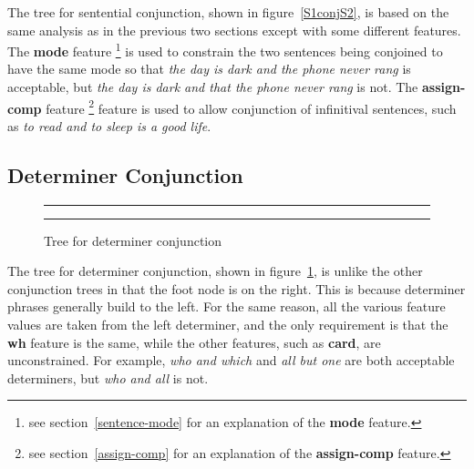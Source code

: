 The tree for sentential conjunction, shown in figure~\ref{S1conjS2}, is
based on the same analysis as in the previous two sections except with
some different features.  The {\bf mode}
feature \footnote{see section~\ref{sentence-mode} 
for an explanation of the {\bf mode} feature.} 
is used to 
constrain the two sentences being conjoined to have the same mode so that
{\it the day is dark and the phone never rang} is acceptable, but 
{\it the day is dark and that the phone never rang} is not.  The 
{\bf assign-comp} feature \footnote{see section~\ref{assign-comp} 
for an explanation of the {\bf assign-comp} feature.} 
feature is used to allow conjunction of infinitival sentences, such as
{\it to read and to sleep is a good life}.

\subsection{Determiner Conjunction}
\begin{figure}[ht]
\centering
\rule[.1in]{5.0in}{0.01in}
\caption{Tree for determiner conjunction}
\rule[.1in]{5.0in}{0.01in}
\label{DX1conjDX2}
\end{figure}

The tree for determiner conjunction, shown in figure~\ref{DX1conjDX2},
is unlike the other conjunction trees in that the foot node is on the right.
This is because 
determiner phrases generally build to the left. For the same reason,
all the various feature values are taken from the left determiner, and the
only requirement is that the {\bf wh} feature is the same, while the
other features, such as {\bf card}, are unconstrained.  For example,
{\it who and which} and {\it all but one} are both acceptable determiners,
but {\it who and all} is not. 

